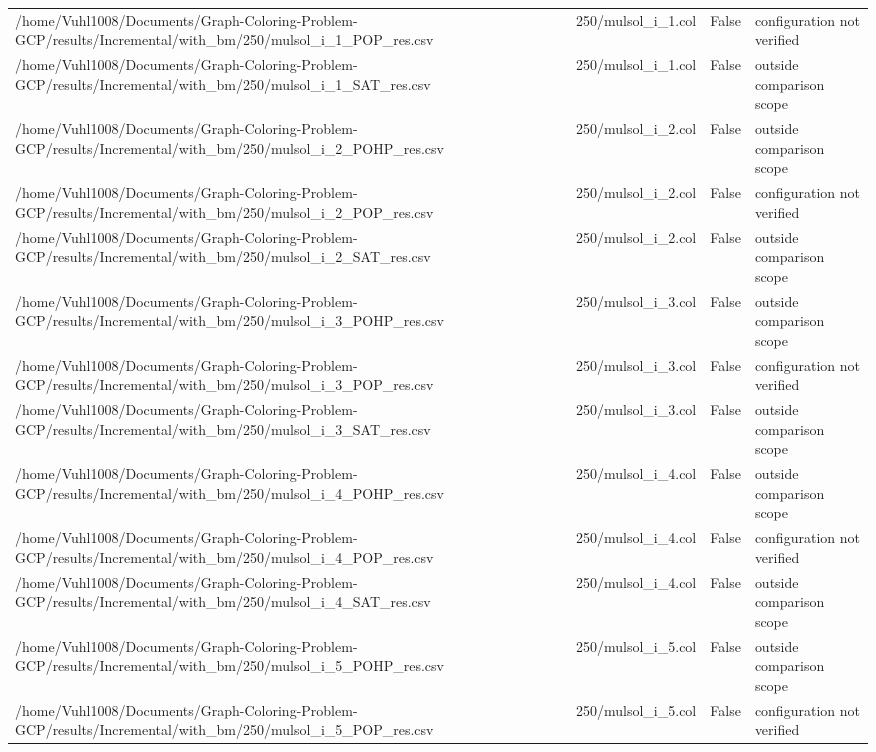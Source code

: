 \begin{table}[htbp]
\begin{tabular}{llll}
/home/Vuhl1008/Documents/Graph-Coloring-Problem-GCP/results/Incremental/with\_bm/250/mulsol\_i\_1\_POP\_res.csv & 250/mulsol\_i\_1.col & False & configuration not verified \\
/home/Vuhl1008/Documents/Graph-Coloring-Problem-GCP/results/Incremental/with\_bm/250/mulsol\_i\_1\_SAT\_res.csv & 250/mulsol\_i\_1.col & False & outside comparison scope \\
/home/Vuhl1008/Documents/Graph-Coloring-Problem-GCP/results/Incremental/with\_bm/250/mulsol\_i\_2\_POHP\_res.csv & 250/mulsol\_i\_2.col & False & outside comparison scope \\
/home/Vuhl1008/Documents/Graph-Coloring-Problem-GCP/results/Incremental/with\_bm/250/mulsol\_i\_2\_POP\_res.csv & 250/mulsol\_i\_2.col & False & configuration not verified \\
/home/Vuhl1008/Documents/Graph-Coloring-Problem-GCP/results/Incremental/with\_bm/250/mulsol\_i\_2\_SAT\_res.csv & 250/mulsol\_i\_2.col & False & outside comparison scope \\
/home/Vuhl1008/Documents/Graph-Coloring-Problem-GCP/results/Incremental/with\_bm/250/mulsol\_i\_3\_POHP\_res.csv & 250/mulsol\_i\_3.col & False & outside comparison scope \\
/home/Vuhl1008/Documents/Graph-Coloring-Problem-GCP/results/Incremental/with\_bm/250/mulsol\_i\_3\_POP\_res.csv & 250/mulsol\_i\_3.col & False & configuration not verified \\
/home/Vuhl1008/Documents/Graph-Coloring-Problem-GCP/results/Incremental/with\_bm/250/mulsol\_i\_3\_SAT\_res.csv & 250/mulsol\_i\_3.col & False & outside comparison scope \\
/home/Vuhl1008/Documents/Graph-Coloring-Problem-GCP/results/Incremental/with\_bm/250/mulsol\_i\_4\_POHP\_res.csv & 250/mulsol\_i\_4.col & False & outside comparison scope \\
/home/Vuhl1008/Documents/Graph-Coloring-Problem-GCP/results/Incremental/with\_bm/250/mulsol\_i\_4\_POP\_res.csv & 250/mulsol\_i\_4.col & False & configuration not verified \\
/home/Vuhl1008/Documents/Graph-Coloring-Problem-GCP/results/Incremental/with\_bm/250/mulsol\_i\_4\_SAT\_res.csv & 250/mulsol\_i\_4.col & False & outside comparison scope \\
/home/Vuhl1008/Documents/Graph-Coloring-Problem-GCP/results/Incremental/with\_bm/250/mulsol\_i\_5\_POHP\_res.csv & 250/mulsol\_i\_5.col & False & outside comparison scope \\
/home/Vuhl1008/Documents/Graph-Coloring-Problem-GCP/results/Incremental/with\_bm/250/mulsol\_i\_5\_POP\_res.csv & 250/mulsol\_i\_5.col & False & configuration not verified \\

\end{tabular}
\end{table}
